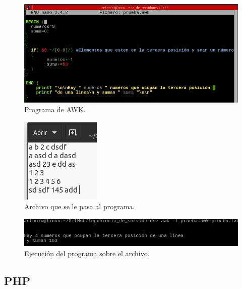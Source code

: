 \begin{figure}[H]
    \begin{center}
    \advance\leftskip-2.2cm
        \includegraphics[scale=0.75]{imagenes/img39}
        \caption{Programa de AWK.}
        \label{fig36}
    \end{center}
\end{figure}
\begin{figure}[H]
    \begin{center}
        \includegraphics[scale=0.8]{imagenes/img40}
        \caption{Archivo que se le pasa al programa.}
        \label{fig37}
    \end{center}
\end{figure}
\begin{figure}[H]
    \begin{center}
    \advance\leftskip-1cm
        \includegraphics[scale=0.7]{imagenes/img41}
        \caption{Ejecución del programa sobre el archivo.}
        \label{fig38}
    \end{center}
\end{figure}




\subsection{PHP}
